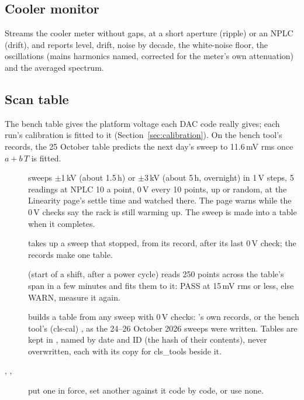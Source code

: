 \subsection{Cooler monitor}

Streams the cooler meter without gaps, at a short aperture (ripple) or an NPLC (drift), and
reports level, drift, noise by decade, the white-noise floor, the oscillations (mains
harmonics named, corrected for the meter's own attenuation) and the averaged spectrum.

\subsection{Scan table}
\label{sec:table}

The bench table gives the platform voltage each DAC code really gives; each run's
calibration is fitted to it (Section~\ref{sec:calibration}). On the bench tool's records,
the 25 October table predicts the next day's sweep to 11.6\,mV rms once $a + b\,T$ is
fitted.

\begin{description}
    \item[] sweeps  $\pm$1\,kV (about 1.5\,h) or $\pm$3\,kV
        (about 5\,h, overnight) in 1\,V steps, 5 readings at NPLC 10 a point, 0\,V every 10
        points,  up or random, at the Linearity page's settle time and watched
        there. The page warns while the 0\,V checks say the rack is still warming up. The
        sweep is made into a table when it completes.
    \item[] takes up a sweep that stopped, from its record, after its last
        0\,V check; the records make one table.
    \item[] (start of a shift, after a power cycle) reads 250 points across
        the table's span in a few minutes and fits them to it: PASS at 15\,mV rms or less,
        else WARN, measure it again.
    \item[] builds a table from any sweep with 0\,V
        checks: \oracle{}'s own records, or the bench tool's (cls-cal) ,
        as the 24--26 October 2026 sweeps were written. Tables are kept in
        , named by date and ID (the hash of their contents), never
        overwritten, each with its copy for cls\_tools beside it.
    \item[, , ] put one in force, set
        another against it code by code, or use none.
\end{description}

